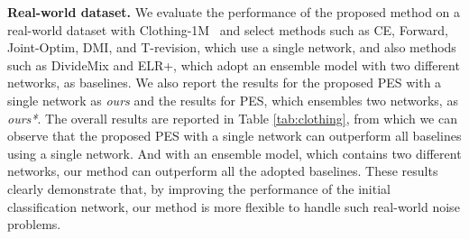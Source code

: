 \documentclass[11pt]{article}
\begin{document}
\noindent \textbf{Real-world dataset.} We evaluate the performance of the proposed method on a real-world dataset with Clothing-1M~\cite{Xiao2015Clothing} and select methods such as CE, Forward, Joint-Optim, DMI, and T-revision, which use a single network, and also methods such as DivideMix and ELR+, which adopt an ensemble model with two different networks, as baselines. We also report the results for the proposed PES with a single network as \emph{ours} and the results for PES, which ensembles two networks, as \emph{ours*}. The overall results are reported in Table \ref{tab:clothing}, from which we can observe that the proposed PES with a single network can outperform all baselines using a single network. And with an ensemble model, which contains two different networks, our method can outperform all the adopted baselines. These results clearly demonstrate that, by improving the performance of the initial classification network, our method is more flexible to handle such real-world noise problems.

\begin{table}[!tp]
\centering
\fontsize{8.5}{10}\selectfont
\label{tab:cifar100}
\caption{Compassion with state-of-the-art methods on Clothing-1M. Results of baseline methods are taken from the original papers. ours represent the results obtained by PES with a single network and ours* indicate the results obtained by PES with an ensemble model. }
\vspace{5pt}
\label{tab:clothing}
\end{table}
\end{document}
